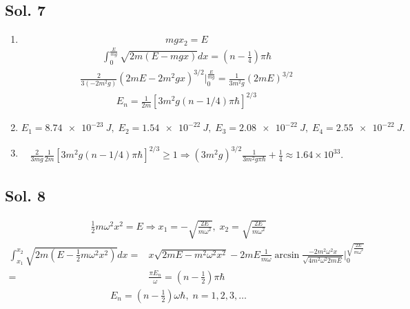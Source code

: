 \subsection*{Sol. 7}
\begin{enumerate}
    \item 
    $$
    mgx_2 = E 
    $$
    \begin{align*}
        \int_0^{\frac{E}{mg}}
        \sqrt{2m(E - mgx)}dx = \left( n -\frac{1}{4}\right)\pi\hbar
    \end{align*}
    \begin{align*}
        \frac{2}{3(-2m^2 g)}
        (2mE - 2m^2 gx)^{3/2}\bigg|^{\frac{E}{mg}}_0=
        \frac{1}{3m^2 g}(2mE)^{3/2}
    \end{align*}
    \begin{align*}
        E_n = \frac{1}{2m}
        \left[
        3m^2 g(n-1/4)\pi\hbar
        \right]^{2/3}
    \end{align*}
    \item 
    $$
    E_1=\qty{8.74e-23}{J},\;
    E_2=\qty{1.54e-22}{J},\;
    E_3=\qty{2.08e-22}{J},\;
    E_4 = \qty{2.55e-22}{J}.
    $$
    \item 
    \begin{align*}
        \frac{2}{3mg}\frac{1}{2m}
        \left[
        3m^2 g(n-1/4)\pi\hbar
        \right]^{2/3}\geq 1
        \Rightarrow
        (3m^2g)^{3/2}
        \frac{1}{3m^2 g\pi\hbar}+\frac{1}{4}
        \approx 1.64\times 10^{33}.
    \end{align*}
    
\end{enumerate}

\subsection*{Sol. 8}
\begin{align*}
    \frac{1}{2}m\omega^2x^2 = E
    \Rightarrow
    x_1=-\sqrt{\frac{2E}{m\omega^2}},\;
    x_2=\sqrt{\frac{2E}{m\omega^2}}
\end{align*}
\begin{align*}
    \int_{x_1}^{x_2}
    \sqrt{2m(E-\frac{1}{2}m\omega^2x^2)}
    dx
    =&
    x\sqrt{2mE-m^2\omega^2x^2}
    -2mE
    \frac{1}{m\omega}
    \arcsin\frac{-2m^2\omega^2 x}{\sqrt{4m^2\omega^2 2mE}}
    \bigg|^{\sqrt{\frac{2E}{m\omega^2}}}_0\\
    =&
    \frac{\pi E_n}{\omega}
    =\left(n-\frac{1}{2}\right)\pi\hbar 
\end{align*}
\begin{align*}
    E_n = 
    \left(n-\frac{1}{2}\right)\omega\hbar,\;
    n=1,2,3,\dots
\end{align*}

